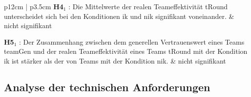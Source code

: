\documentclass[a4paper,11pt]{article}%
\renewcommand{\\}{\vspace*{0.5\baselineskip} \newline}
\begin{document}
\begin{table}[H]
\begin{tabularx}{\textwidth}{p{12cm} | p{3.5cm}}
		\hline 	\\	
		\textbf{H4$_{1}$} : Die Mittelwerte der realen Teameffektivität \ac{tRound} unterscheidet sich bei den Konditionen \ac{ik} und \ac{nik} signifikant voneinander.\\
		& nicht signifikant\\

		\hline 	\\	
			\textbf{H5$_{1}$} : Der Zusammenhang zwischen dem generellen Vertrauenswert eines Teams \ac{teamGen} und der realen Teameffektivität eines Teams \ac{tRound} mit der Kondition \ac{ik} ist stärker als der von Teams mit der Kondition \ac{nik}.
		& nicht signifikant \\
		
		\hline 	\\
		
	\end{tabularx}
\end{table}		


\subsection{Analyse der technischen Anforderungen}
\end{document}
